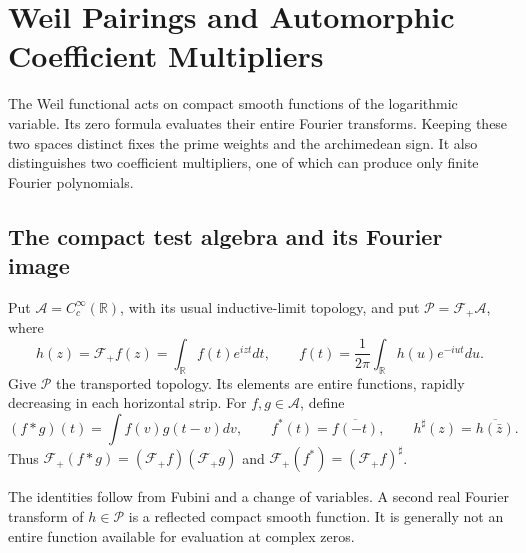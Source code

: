 \chapter{Weil Pairings and Automorphic Coefficient Multipliers}
\label{v4-arith:w5-a:chapter}

The Weil functional acts on compact smooth functions of the logarithmic
variable. Its zero formula evaluates their entire Fourier transforms.
Keeping these two spaces distinct fixes the prime weights and the
archimedean sign. It also distinguishes two coefficient multipliers,
one of which can produce only finite Fourier polynomials.

\section{The compact test algebra and its Fourier image}
\label{v4-arith:w5-a:weil-explicit}
\label{v4-arith:w5-a:weil-explicit:PW}

\begin{definition}
\label{v4-arith:w5-a:def:PW}
Put $\mathscr A=C_c^\infty(\mathbb R)$, with its usual
inductive-limit topology, and put $\mathscr P=\mathcal F_+\mathscr A$,
where
\[
 h(z)=\mathcal F_+f(z)=\int_{\mathbb R}f(t)e^{izt}dt,
 \qquad
 f(t)=\frac1{2\pi}\int_{\mathbb R}h(u)e^{-iut}du.
\]
Give $\mathscr P$ the transported topology. Its elements are entire
functions, rapidly decreasing in each horizontal strip.
For $f,g\in\mathscr A$, define
\[
 (f*g)(t)=\int f(v)g(t-v)dv,\qquad
 f^*(t)=\overline{f(-t)},\qquad h^\sharp(z)=\overline{h(\bar z)}.
\]
Thus $\mathcal F_+(f*g)=(\mathcal F_+f)(\mathcal F_+g)$ and
$\mathcal F_+(f^*)=(\mathcal F_+f)^\sharp$.
\end{definition}

The identities follow from Fubini and a change of variables. A second
real Fourier transform of $h\in\mathscr P$ is a reflected compact
smooth function. It is generally not an entire function available for
evaluation at complex zeros.

